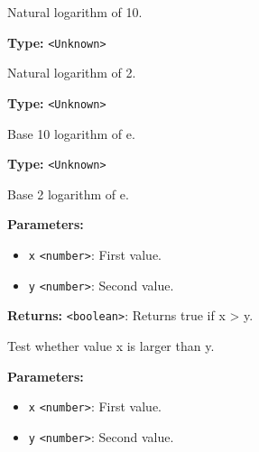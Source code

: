 \documentclass[12pt,a4paper]{article}
\begin{document}
\noindent Natural logarithm of 10.

\vspace{5mm}
\noindent {}\vspace{4mm}


\noindent \textbf{Type:} \texttt{<Unknown>}

\noindent Natural logarithm of 2.

\vspace{5mm}
\noindent {}\vspace{4mm}


\noindent \textbf{Type:} \texttt{<Unknown>}

\noindent Base 10 logarithm of e.

\vspace{5mm}
\noindent {}\vspace{4mm}


\noindent \textbf{Type:} \texttt{<Unknown>}

\noindent Base 2 logarithm of e.

\vspace{5mm}
\noindent {}


\noindent \textbf{Parameters:}
\begin{itemize}
  \item \texttt{x} \texttt{<number>}: First value.
  \item \texttt{y} \texttt{<number>}: Second value.
\end{itemize}

\noindent \textbf{Returns:} \texttt{<boolean>}: Returns true if x > y.

\noindent Test whether value x is larger than y.

\vspace{5mm}
\noindent {}


\noindent \textbf{Parameters:}
\begin{itemize}
  \item \texttt{x} \texttt{<number>}: First value.
  \item \texttt{y} \texttt{<number>}: Second value.
\end{itemize}
\end{document}
